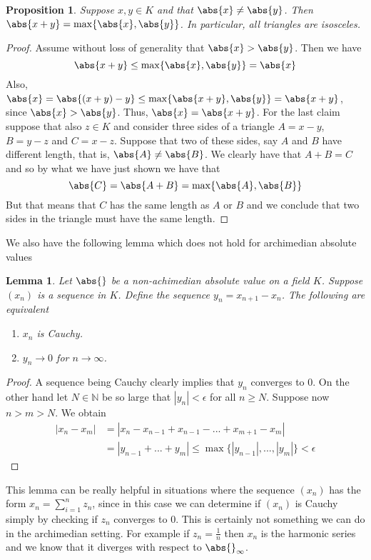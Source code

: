 \documentclass{article}
\newtheorem{proposition}{Proposition}[section]
\newtheorem{lemma}{Lemma}[section]
\newcommand{\mbb}[1]{\mathbb{#1}}
\numberwithin{equation}{section}
\begin{document}
\begin{proposition}\label{prop: Triangles are isosceles}
    Suppose $x,y \in K$ and that $\abs{x} \neq \abs{y}$. Then $\abs{x + y} = \max \{\abs{x}, \abs{y}\}$. In particular, all triangles are isosceles.
\end{proposition}
\begin{proof}
    Assume without loss of generality that $\abs{x} > \abs{y}$. Then we have
    $$\abs{x + y} \leq \max \{\abs{x}, \abs{y}\} =\abs{x}$$
    Also, $\abs{x} = \abs{(x + y) - y} \leq \max\{\abs{x + y}, \abs{y}\} = \abs{x + y}$, since $\abs{x} > \abs{y}$. Thus, $\abs{x} = \abs{x + y}$. For the last claim suppose that also $z \in K$ and consider three sides of a triangle $A = x - y$, $B = y - z$ and $C = x-z$. Suppose that two of these sides, say $A$ and $B$ have different length, that is, $\abs{A} \neq \abs{B}$. We clearly have that $A + B = C$ and so by what we have just shown we have that
    $$\abs{C} = \abs{A + B} = \max\{\abs{A}, \abs{B}\}$$
    But that means that $C$ has the same length as $A$ or $B$ and we conclude that two sides in the triangle must have the same length.
\end{proof}

We also have the following lemma which does not hold for archimedian absolute values

\begin{lemma} \label{lem:SufficientConditionForConvergence}
    Let $\abs{}$ be a non-achimedian absolute value on a field $K$. Suppose $(x_n)$ is a sequence in $K$. Define the sequence $y_n = x_{n+1} - x_{n}$. The following are equivalent
    \begin{enumerate}
        \item $x_n$ is Cauchy.
        \item $y_n \to 0$ for $n \to \infty$.
    \end{enumerate}
\end{lemma}
\begin{proof}
    A sequence being Cauchy clearly implies that $y_n$ converges to 0. On the other hand let $N \in \mbb N$ be so large that $|y_n| < \epsilon$ for all $n \geq N$. Suppose now $n > m > N$. We obtain
    \begin{align*}
        |x_n - x_m| & = |x_n - x_{n-1} + x_{n-1} - ... + x_{m+1} - x_{m}|                          \\
                    & = |y_{n-1} + ... + y_{m}| \leq \max \{|y_{n-1}|, ..., |y_m|  \} < \epsilon
    \end{align*}
\end{proof}
This lemma can be really helpful in situations where the sequence $(x_n)$ has the form $x_n = \sum_{i = 1}^n z_n$, since in this case we can determine if $(x_n)$ is Cauchy simply by checking if $z_n$ converges to 0. This is certainly not something we can do in the archimedian setting. For example if $z_n = \frac{1}{n}$ then $x_n$ is the harmonic series and we know that it diverges with respect to $\abs{}_\infty$.
\end{document}
